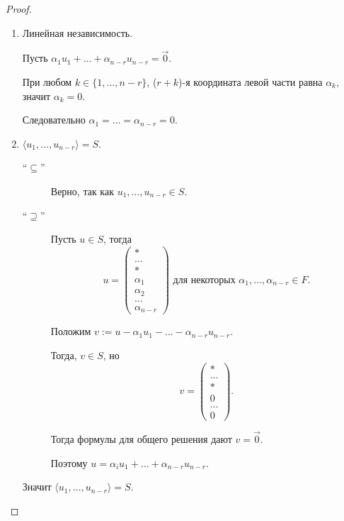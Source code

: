 \begin{proof}~
    \begin{enumerate}
    \item Линейная независимость.

        Пусть $\alpha_1 u_1 + \dots + \alpha_{n - r} u_{n - r} = \overrightarrow{0}$.

        При любом $k \in \{1, \dots, n - r\}$, ($r + k$)-я координата левой части равна $\alpha_k$, значит $\alpha_k = 0$.
        
        Следовательно $\alpha_1 = \dots = \alpha_{n - r} = 0$.

    \item $\langle u_1, \dots, u_{n - r} \rangle = S$.

        \begin{description}
        \item[``$\subseteq$'']
            Верно, так как $u_1, \dots, u_{n - r} \in S$.

        \item[``$\supseteq$'']
            Пусть $u \in S$, тогда
            \begin{equation*}
                u = \begin{pmatrix} * \\ \dots \\ * \\ \alpha_1 \\ \alpha_2 \\ \dots \\ \alpha_{n - r} \end{pmatrix} \text{ для некоторых } \alpha_1, \dots, \alpha_{n - r} \in F
            .\end{equation*}

            Положим $v := u - \alpha_1 u_1 - \dots - \alpha_{n - r} u_{n - r}$.

            Тогда, $v \in S$, но
            \begin{equation*}
                v = \begin{pmatrix} * \\ \dots \\ * \\ 0 \\ \dots \\ 0 \end{pmatrix}
            .\end{equation*}

            Тогда формулы для общего решения дают $v = \overrightarrow{0}$.

            Поэтому $u = \alpha_i u_1 + \dots + \alpha_{n - r} u_{n - r}$.
        \end{description}
        Значит $\langle u_1, \dots, u_{n - r} \rangle = S$.
        \qedhere
    \end{enumerate}
\end{proof}

